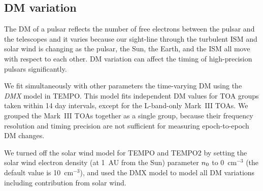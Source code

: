 



\subsection{DM variation}
\label{sec:dmx}
The DM of a pulsar reflects the number of free electrons between
the pulsar and the telescopes and it varies because
our sight-line through the turbulent ISM and solar wind is changing as the
pulsar, the Sun, the Earth, and the ISM all move with respect to each other.
DM variation can affect the timing of high-precision pulsars significantly.

We fit simultaneously with other parameters the time-varying DM using the {\it
DMX} model in {\sc TEMPO}.
This model fits independent DM values for TOA groups taken within 14 day
intervals, except for the L-band-only Mark~III TOAs. We grouped the Mark~III
TOAs together as a single group, because their frequency resolution and timing
precision are not sufficient for measuring epoch-to-epoch DM changes.

We turned off the solar wind model for \textsc{TEMPO} and \textsc{TEMPO2} by
setting the solar wind electron density (at 1~AU from the Sun) parameter
$n_{\rm 0}$ to 0~cm$^{-3}$ (the default value is 10~cm$^{-3}$), and used the
DMX model to model all DM variations including contribution from solar wind.

